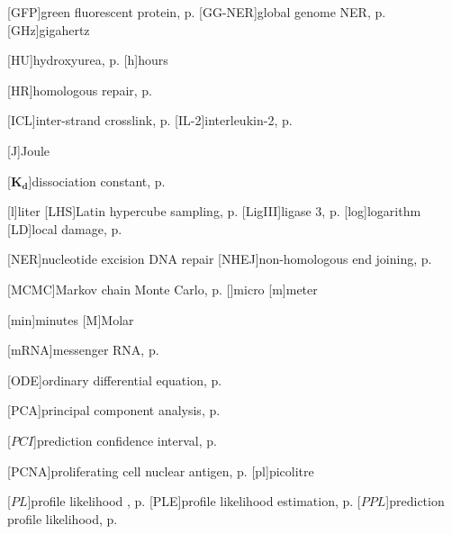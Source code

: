 \begin{acronym}
[GFP]{green fluorescent protein, p. \pageref{sec:NERmechanism}}
[GG-NER]{global genome NER, p. \pageref{sec:NERmechanism}}
[GHz]{gigahertz}

[HU]{hydroxyurea, p. \pageref{sec:FLIP}}
[h]{hours}

[HR]{homologous repair, p. \pageref{sec:intro_reg_repair}}

[ICL]{inter-strand crosslink, p. \pageref{sec:intro_reg_repair}}
[IL-2]{interleukin-2, p. \pageref{sec:FOXp3}}

[J]{Joule}


[$\textbf{K}_\textbf{d}$]{dissociation constant, p. \pageref{tab:KdValues}}

[l]{liter}
[LHS]{Latin hypercube sampling, p. \pageref{sec:ANSI}}
[LigIII]{ligase 3, p. \pageref{sec:NERmechanism}}
[log]{logarithm}
[LD]{local damage, p. \pageref{sec:eGFP}}


[NER]{nucleotide excision DNA repair}
[NHEJ]{non-homologous end joining, p. \pageref{sec:intro_reg_repair}}



[MCMC]{Markov chain Monte Carlo, p. \pageref{sec:MCMC}}
[{\textmu}]{micro}
[m]{meter}


[min]{minutes}
[M]{Molar}

[mRNA]{messenger RNA, p. \pageref{sec:mRNA}}





[ODE]{ordinary differential equation, p. \pageref{sec:ODE}}






[PCA]{principal component analysis, p. \pageref{sec:pca}}

[$\boldsymbol{ \mathit{PCI}}$]{prediction confidence interval, p. \pageref{eqn:confidenceIntervalsPPL}}

[PCNA]{proliferating cell nuclear antigen, p. \pageref{sec:NERmechanism}}
[pl]{picolitre}

[$\boldsymbol{ \mathit{PL} }$]{profile likelihood , p. \pageref{sec:PLE}}
[PLE]{profile likelihood estimation, p. \pageref{sec:PLE}}
[$\boldsymbol{ \mathit{PPL} }$]{prediction profile likelihood, p. \pageref{sec:ppl}}


\end{acronym}
